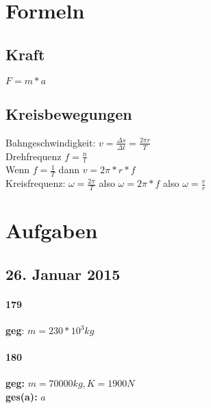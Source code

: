 \documentclass[11pt,twoside,a4paper]{article}
\title{\titleText}
\author{\authorText}
\date{\dateText}
\begin{document}
	\maketitle
	\tableofcontents

        \section{Formeln}

        \subsection{Kraft}

        \(F = m * a \)

        \subsection{Kreisbewegungen}

        Bahngeschwindigkeit: \(v = \frac{\Delta s}{\Delta t} = \frac{2\pi r}{T}\)\\
        Drehfrequenz \(f = \frac{n}{t}\)\\

        Wenn \(f = \frac{1}{T}\) dann \(v = 2\pi * r * f\)\\
        Kreisfrequenz: \(\omega = \frac{2\pi}{T}\) also \(\omega = 2\pi * f\) also \(\omega = \frac{v}{r}\)
        \section{Aufgaben}

        \subsection{26. Januar 2015}

        \paragraph{179}

        \textbf{geg}: \(m = 230 * 10^3 kg\)

        \paragraph{180}

        \textbf{geg:} \(m = 70000kg, K = 1900N\)\\
        \textbf{ges(a):} \(a\)
\end{document}
